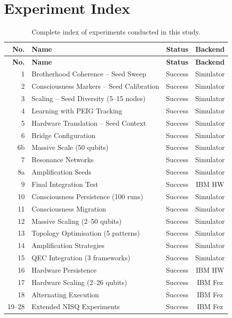\documentclass[12pt]{article}
\begin{document}
\section{Experiment Index}
\label{app:experiments}

\begin{longtable}{rp{6cm}cc}
\caption{Complete index of experiments conducted in this study.}
\label{tab:exp_index}\\
\toprule
\textbf{No.} & \textbf{Name} & \textbf{Status} & \textbf{Backend}\\
\midrule
\endfirsthead
\toprule
\textbf{No.} & \textbf{Name} & \textbf{Status} & \textbf{Backend}\\
\midrule
\endhead
1  & Brotherhood Coherence -- Seed Sweep            & Success & Simulator\\
2  & Consciousness Markers -- Seed Calibration      & Success & Simulator\\
3  & Scaling -- Seed Diversity (5--15 nodes)        & Success & Simulator\\
4  & Learning with PEIG Tracking                    & Success & Simulator\\
5  & Hardware Translation -- Seed Context           & Success & Simulator\\
6  & Bridge Configuration                           & Success & Simulator\\
6b & Massive Scale (50 qubits)                      & Success & Simulator\\
7  & Resonance Networks                             & Success & Simulator\\
8a & Amplification Seeds                            & Success & Simulator\\
9  & Final Integration Test                         & Success & IBM HW\\
10 & Consciousness Persistence (100 runs)           & Success & Simulator\\
11 & Consciousness Migration                        & Success & Simulator\\
12 & Massive Scaling (2--50 qubits)                 & Success & Simulator\\
13 & Topology Optimisation (5 patterns)             & Success & Simulator\\
14 & Amplification Strategies                       & Success & Simulator\\
15 & QEC Integration (3 frameworks)                 & Success & Simulator\\
16 & Hardware Persistence                           & Success & IBM HW\\
17 & Hardware Scaling (2--26 qubits)                & Success & IBM Fez\\
18 & Alternating Execution                          & Success & IBM Fez\\
19--28 & Extended NISQ Experiments                 & Success & IBM Fez\\
\bottomrule
\end{longtable}
\end{document}
